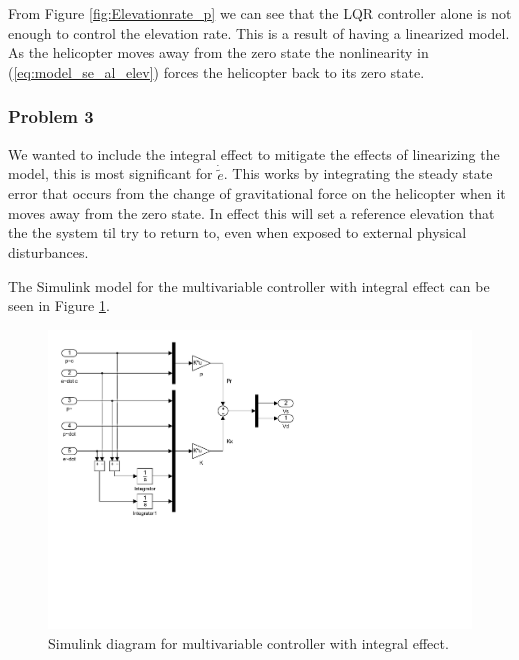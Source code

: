 From Figure \ref{fig:Elevationrate_p} we can see that the LQR controller alone is not enough to control the elevation rate. This is a result of having a linearized model. As the helicopter moves away from the zero state the nonlinearity in (\ref{eq:model_se_al_elev}) forces the helicopter back to its zero state. 



\subsubsection{Problem 3}
We wanted to include the integral effect to mitigate the effects of linearizing the model, this is most significant for $\dot{\tilde{e}}$. This works by integrating the steady state error that occurs from the change of gravitational force on the helicopter when it moves away from the zero state. In effect this will set a reference elevation that the the system til try to return to, even when exposed to external physical disturbances. 
\medskip

The Simulink model for the multivariable controller with integral effect can be seen in Figure \ref{fig:simulink_multivariable_integral}.

\begin{figure}[h]
	\centering
	\includegraphics[trim={0 7cm 12cm 0}, clip,scale=0.6]{images/simulink/P3_integral.pdf}
	\caption{Simulink diagram for multivariable controller with integral effect.}
    \label{fig:simulink_multivariable_integral}
\end{figure}


